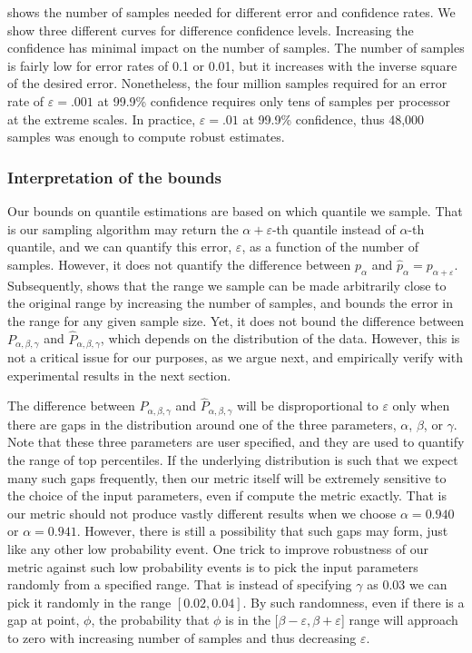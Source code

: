 \documentclass[final]{siamltex}
\newcommand{\eps}{\varepsilon}
\newcommand{\pmetric}{P}
\newcommand{\pt}{{p}}
\begin{document}
 shows the number of samples needed
for different error  and confidence rates. We show three different curves for
difference confidence levels. Increasing the confidence has minimal
impact on the number of samples. The number of samples is fairly low
for error rates of 0.1 or 0.01, but it increases with the inverse
square of the desired error. 
Nonetheless, the four million samples required for an error rate of $\eps = .001$ at 99.9\% confidence
requires only tens of samples per processor at the extreme scales.  In practice, $\eps = .01$ at 99.9\% confidence, thus 48,000  samples was enough to compute robust estimates. 

\subsubsection{Interpretation of the bounds}
Our bounds on  quantile estimations are based on which quantile we sample.  That
is our sampling algorithm may return the $\alpha+\eps$-th quantile  instead of
$\alpha$-th quantile, and we can quantify this error, $\eps$, as a function of
the number of samples.  However, it does not quantify  the difference between
${\pt}_{\alpha}$  and  $\widehat{\pt}_{\alpha}={\pt}_{\alpha+\eps}$.
Subsequently,  shows that the range we sample can be made
arbitrarily close to the original range by increasing the number of samples,
and  bounds the error in the range for any given sample size. Yet, it does not bound the difference between $\pmetric_{\alpha,\beta,\gamma}$ and $\widehat{\pmetric}_{\alpha,\beta,\gamma}$, which depends on the distribution of the data.  However,  this is not a critical issue for our purposes, as we argue next, and empirically verify with experimental results in the next section.  

The difference between $\pmetric_{\alpha,\beta,\gamma}$ and $\widehat{\pmetric}_{\alpha,\beta,\gamma}$ will be disproportional to $\eps$ only when there are gaps in the distribution around one of the three parameters,  $\alpha$, $\beta$, or $\gamma$.  Note that these three parameters are user specified, and they are used to quantify the range of top percentiles. If the underlying distribution is such that we expect many such gaps frequently,  then  our  metric itself  will be extremely sensitive to the choice of  the input parameters, even if compute the metric exactly. That is our metric should not produce vastly different  results when we choose $\alpha =0.940$  or $\alpha =0.941$.  However, there is  still a possibility that such gaps  may form, just like any other  low probability event.  One trick to  improve robustness of our metric against such low probability events is to pick the  input parameters randomly from a specified range.  That is instead of specifying $\gamma$ as $0.03$ we can pick it randomly in the range $[0.02,0.04]$.  By such randomness, even if there is a gap at point, $\phi$, the probability that $\phi$ is in the $[\beta-\eps,\beta+\eps$] range will approach to zero with increasing number of  samples and thus decreasing $\eps$.    
  
\end{document}
